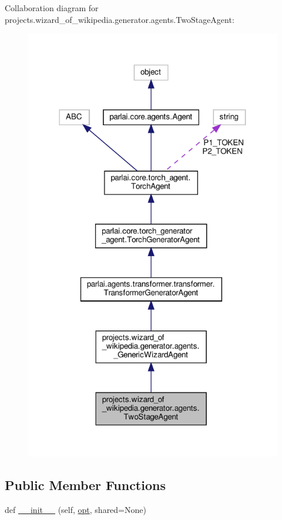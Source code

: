 Collaboration diagram for projects.\+wizard\+\_\+of\+\_\+wikipedia.\+generator.\+agents.\+Two\+Stage\+Agent\+:
\nopagebreak
\begin{figure}[H]
\begin{center}
\leavevmode
\includegraphics[width=318pt]{da/d8a/classprojects_1_1wizard__of__wikipedia_1_1generator_1_1agents_1_1TwoStageAgent__coll__graph}
\end{center}
\end{figure}
\subsection*{Public Member Functions}
\begin{DoxyCompactItemize}
\item 
def \hyperlink{classprojects_1_1wizard__of__wikipedia_1_1generator_1_1agents_1_1TwoStageAgent_a5aae49d192aac40f8fde1b1c42409261}{\+\_\+\+\_\+init\+\_\+\+\_\+} (self, \hyperlink{classparlai_1_1core_1_1torch__agent_1_1TorchAgent_a785bb920cf8c8afc3e9bf6a8b77e335a}{opt}, shared=None)
\end{DoxyCompactItemize}
